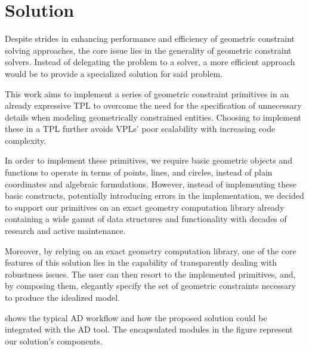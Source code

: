 \section{Solution}%
\label{sec:solution}

Despite strides in enhancing performance and efficiency of geometric constraint
solving approaches, the core issue lies in the generality of geometric
constraint solvers.  Instead of delegating the problem to a solver, a more
efficient approach would be to provide a specialized solution for said problem.

This work aims to implement a series of geometric constraint primitives in an
already expressive \ac{TPL} to overcome the need for the specification of
unnecessary details when modeling geometrically constrained entities.  Choosing
to implement these in a \ac{TPL} further avoids \acp{VPL}' poor scalability with
increasing code complexity.

In order to implement these primitives, we require basic geometric objects and
functions to operate in terms of points, lines, and circles, instead of plain
coordinates and algebraic formulations.  However, instead of implementing these
basic constructs, potentially introducing errors in the implementation, we
decided to support our primitives on an exact geometry computation library
already containing a wide gamut of data structures and functionality with
decades of research and active maintenance.

Moreover, by relying on an exact geometry computation library, one of the core
features of this solution lies in the capability of transparently dealing with
robustness issues.  The user can then resort to the implemented primitives, and,
by composing them, elegantly specify the set of geometric constraints necessary
to produce the idealized model.

 shows the typical \ac{AD} workflow and how the proposed
solution could be integrated with the \ac{AD} tool.  The encapsulated modules in
the figure represent our solution's components.

